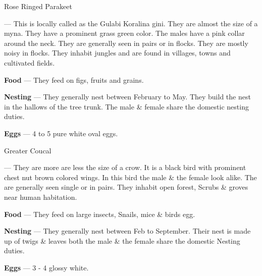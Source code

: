 \begin{bird}{Rose Ringed Parakeet}

 --- This is locally called as the Gulabi Koralina gini. They are almost the size of a myna. They have a prominent grass green color. The males have a pink collar around the neck. They are generally seen in pairs or in flocks. They are mostly noisy in flocks. They inhabit 
jungles and are found in villages, towns and cultivated fields.

{\large\bf Food} --- They feed on figs, fruits and grains. 

{\large\bf Nesting} --- They generally nest between February to May. They build the nest in the hallows of the tree trunk. The male \& female share the domestic nesting duties.

{\large\bf Eggs} --- 4 to 5 pure white oval eggs.
\end{bird}

\begin{bird}{Greater Coucal}

 --- They are more are less the size of a crow. It is a black bird with prominent chest nut brown colored wings. In this bird the male \& the female look alike. The are generally seen single or in pairs. They inhabit open forest, Scrubs \& groves near human habitation. 

{\large\bf Food} --- They feed on large insects, Snails, mice \& birds egg.

{\large\bf Nesting} --- They generally nest between Feb to September. Their nest is made up of twigs \& leaves both the male \& the female share the domestic Nesting duties.

{\large\bf Eggs} --- 3 - 4 glossy white.
\end{bird}

